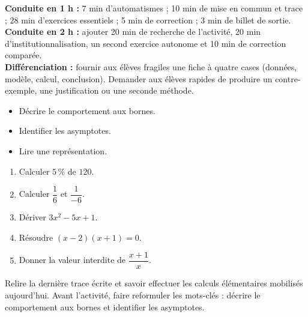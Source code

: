\ifprof
\begin{methode}
\textbf{Conduite en 1 h :} 7 min d'automatismes ; 10 min de mise en commun et trace ; 28 min d'exercices essentiels ; 5 min de correction ; 3 min de billet de sortie.\\
\textbf{Conduite en 2 h :} ajouter 20 min de recherche de l'activité, 20 min d'institutionnalisation, un second exercice autonome et 10 min de correction comparée.\\
\textbf{Différenciation :} fournir aux élèves fragiles une fiche à quatre cases (données, modèle, calcul, conclusion). Demander aux élèves rapides de produire un contre-exemple, une justification ou une seconde méthode.
\end{methode}
\fi
{}
\begin{objectifs}\begin{itemize}\item Décrire le comportement aux bornes.\item Identifier les asymptotes.\item Lire une représentation.\end{itemize}\end{objectifs}
\begin{automatismes}\begin{enumerate}\item Calculer $5\,\%$ de $120$. \item Calculer $\dfrac1{6}$ et $\dfrac1{-6}$. \item Dériver $3x^2-5x+1$. \item Résoudre $(x-2)(x+1)=0$. \item Donner la valeur interdite de $\dfrac{x+1}{x}$. \end{enumerate}\end{automatismes}
\begin{prerequis}Relire la dernière trace écrite et savoir effectuer les calculs élémentaires mobilisés aujourd'hui. Avant l'activité, faire reformuler les mots-clés : décrire le comportement aux bornes et identifier les asymptotes.\end{prerequis}

